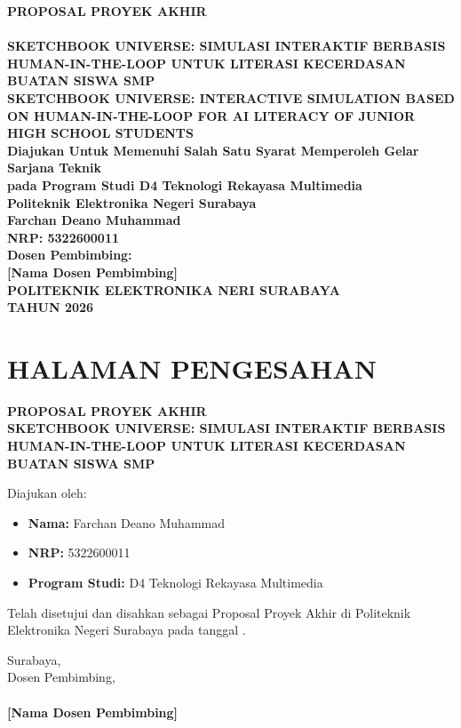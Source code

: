 \documentclass[12pt,a4paper,oneside,openany]{report}
\begin{document}
\begin{titlepage}
\thispagestyle{empty}
\begin{center}
\textbf{PROPOSAL PROYEK AKHIR}\\[1cm]
\textbf{}\\[0.5cm]
\textbf{SKETCHBOOK UNIVERSE: SIMULASI INTERAKTIF BERBASIS HUMAN-IN-THE-LOOP UNTUK LITERASI KECERDASAN BUATAN SISWA SMP}\\[0.5cm]
\textbf{SKETCHBOOK UNIVERSE: INTERACTIVE SIMULATION BASED ON HUMAN-IN-THE-LOOP FOR AI LITERACY OF JUNIOR HIGH SCHOOL STUDENTS}\\[2cm]
\textbf{Diajukan Untuk Memenuhi Salah Satu Syarat Memperoleh Gelar Sarjana Teknik}\\[0.5cm]
\textbf{pada Program Studi D4 Teknologi Rekayasa Multimedia}\\[0.5cm]
\textbf{Politeknik Elektronika Negeri Surabaya}\\[2cm]
\textbf{Farchan Deano Muhammad}\\[0.3cm]
\textbf{NRP: 5322600011}\\[2cm]
\textbf{Dosen Pembimbing:}\\[0.3cm]
\textbf{[Nama Dosen Pembimbing]}\\[2cm]
\textbf{POLITEKNIK ELEKTRONIKA NERI SURABAYA}\\[0.3cm]
\textbf{TAHUN 2026}
\end{center}
\end{titlepage}

\chapter*{HALAMAN PENGESAHAN}
\thispagestyle{empty}
\begin{center}
\textbf{PROPOSAL PROYEK AKHIR}\\[0.5cm]
\textbf{SKETCHBOOK UNIVERSE: SIMULASI INTERAKTIF BERBASIS HUMAN-IN-THE-LOOP UNTUK LITERASI KECERDASAN BUATAN SISWA SMP}\\[1cm]
\end{center}
Diajukan oleh:
\begin{itemize}
\item \textbf{Nama:} Farchan Deano Muhammad
\item \textbf{NRP:} 5322600011
\item \textbf{Program Studi:} D4 Teknologi Rekayasa Multimedia
\end{itemize}
Telah disetujui dan disahkan sebagai Proposal Proyek Akhir di Politeknik Elektronika Negeri Surabaya pada tanggal \underline{\hspace{2cm}}.
\vspace{1cm}
\begin{flushright}
Surabaya, \underline{\hspace{3cm}}\\[1cm]
Dosen Pembimbing,\\[2cm]
\underline{\hspace{5cm}}\\[0.3cm]
\textbf{[Nama Dosen Pembimbing]}
\end{flushright}
\newpage
\end{document}
